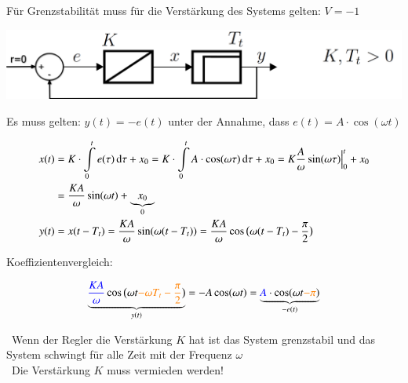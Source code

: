     Für Grenzstabilität muss für die Verstärkung des Systems gelten: $V = -1$ 



    \begin{center}
        \includegraphics[align=center, width=0.75\columnwidth]{images/gegengekoppeltes_system.png}
    \end{center}

    Es muss gelten: $y(t) = -e(t)$ unter der Annahme, dass $e(t) = A \cdot \cos(\omega t)$

    \vspace*{-0.3cm}        %

    \begin{align*}
        x(t) &= K \cdot \int\limits_0^t e(\tau) \mathop{} \! \mathrm{d} \tau + x_0 
            = K \cdot \int\limits_0^t A \cdot \cos(\omega \tau) \mathop{} \! \mathrm{d} \tau + x_0
            = K \frac{A}{\omega} \sin(\omega \tau) \Big|_0^t + x_0 \\
            &= \frac{K A}{\omega} \sin(\omega t) + \underbrace{x_0}_{0} \\
        y(t) &= x(t - T_t) = \frac{K A}{\omega} \sin(\omega (t - T_t)) = \frac{K A}{\omega} \cos \big( \omega( t- T_t) - \frac{\pi}{2}  \big)
    \end{align*}

    Koeffizientenvergleich: 

    $$ \underbrace{ {\color{blue} \frac{K A}{\omega}} \cos \big( \omega t {\color{orange}- \omega T_t - \frac{\pi}{2}}  \big) }_{y(t)}
         = - A \cos(\omega t) = \underbrace{ {\color{blue}A} \cdot \cos(\omega t {\color{orange}- \pi}) }_{-e(t)} $$
    
    \textrightarrow\ Wenn der Regler die Verstärkung $K$ hat ist das System grenzstabil 
    und das System schwingt für alle Zeit mit der Frequenz $\omega$\\
    \textrightarrow\ Die Verstärkung $K$ muss vermieden werden!

    